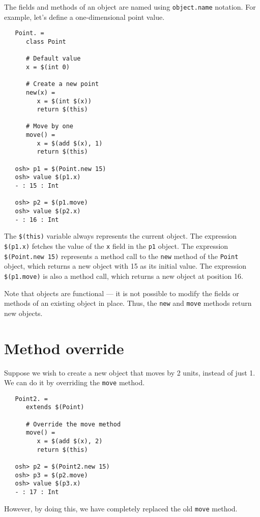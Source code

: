 The fields and methods of an object are named using \verb+object.name+ notation.
For example, let's define a one-dimensional point value.

\begin{verbatim}
   Point. =
      class Point

      # Default value
      x = $(int 0)

      # Create a new point
      new(x) =
         x = $(int $(x))
         return $(this)

      # Move by one
      move() =
         x = $(add $(x), 1)
         return $(this)

   osh> p1 = $(Point.new 15)
   osh> value $(p1.x)
   - : 15 : Int

   osh> p2 = $(p1.move)
   osh> value $(p2.x)
   - : 16 : Int
\end{verbatim}

The \verb+$(this)+ variable always represents the current object.
The expression \verb+$(p1.x)+ fetches the value of the \verb+x+ field
in the \verb+p1+ object.  The expression \verb+$(Point.new 15)+
represents a method call to the \verb+new+ method of the \verb+Point+
object, which returns a new object with 15 as its initial value.  The
expression \verb+$(p1.move)+ is also a method call, which returns a
new object at position 16.

Note that objects are functional --- it is not possible to modify the fields
or methods of an existing object in place.  Thus, the \verb+new+ and \verb+move+
methods return new objects.

\section{Method override}

Suppose we wish to create a new object that moves by 2 units, instead of
just 1.  We can do it by overriding the \verb+move+ method.

\begin{verbatim}
   Point2. =
      extends $(Point)

      # Override the move method
      move() =
         x = $(add $(x), 2)
         return $(this)

   osh> p2 = $(Point2.new 15)
   osh> p3 = $(p2.move)
   osh> value $(p3.x)
   - : 17 : Int
\end{verbatim}

However, by doing this, we have completely replaced the old \verb+move+ method.

